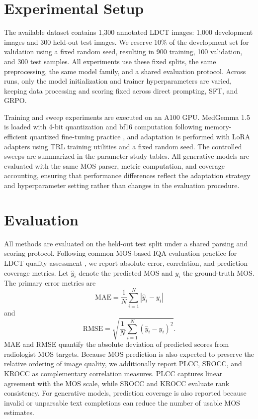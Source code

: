\documentclass[10pt,twocolumn,letterpaper]{article}
\begin{document}
\section{Experimental Setup}
The available dataset contains 1,300 annotated LDCT images: 1,000 development images and 300 held-out test images. We reserve 10\% of the development set for validation using a fixed random seed, resulting in 900 training, 100 validation, and 300 test samples. All experiments use these fixed splits, the same preprocessing, the same model family, and a shared evaluation protocol. Across runs, only the model initialization and trainer hyperparameters are varied, keeping data processing and scoring fixed across direct prompting, SFT, and GRPO.

Training and sweep experiments are executed on an A100 GPU. MedGemma 1.5 is loaded with 4-bit quantization and bf16 computation following memory-efficient quantized fine-tuning practice \cite{dettmers2023qlora}, and adaptation is performed with LoRA adapters using TRL training utilities \cite{trl} and a fixed random seed. The controlled sweeps are summarized in the parameter-study tables. All generative models are evaluated with the same MOS parser, metric computation, and coverage accounting, ensuring that performance differences reflect the adaptation strategy and hyperparameter setting rather than changes in the evaluation procedure.

\section{Evaluation}
All methods are evaluated on the held-out test split under a shared parsing and scoring protocol. Following common MOS-based IQA evaluation practice for LDCT quality assessment \cite{lee2025low}, we report absolute error, correlation, and prediction-coverage metrics. Let $\hat{y}_i$ denote the predicted MOS and $y_i$ the ground-truth MOS. The primary error metrics are
\begin{equation}
  \mathrm{MAE}=\frac{1}{N}\sum_{i=1}^{N}|\hat{y}_i-y_i|
\end{equation}
and
\begin{equation}
  \mathrm{RMSE}=\sqrt{\frac{1}{N}\sum_{i=1}^{N}(\hat{y}_i-y_i)^2}.
\end{equation}
MAE and RMSE quantify the absolute deviation of predicted scores from radiologist MOS targets. Because MOS prediction is also expected to preserve the relative ordering of image quality, we additionally report PLCC, SROCC, and KROCC as complementary correlation measures. PLCC captures linear agreement with the MOS scale, while SROCC and KROCC evaluate rank consistency. For generative models, prediction coverage is also reported because invalid or unparsable text completions can reduce the number of usable MOS estimates.
\end{document}
